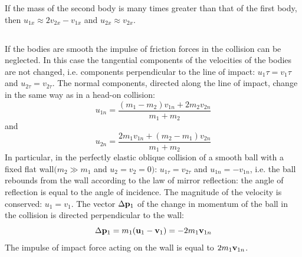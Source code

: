 If the mass of the second body is many times greater than that of the first body, then $u_{1x} \approx 2v_{2x} - v_{1x}$ and $u_{2x} \approx v_{2x}$.

\subsection{}\label{3.5.6}    If the bodies are smooth the impulse of friction forces in the collision can be neglected. In this case the tangential compo­nents of the velocities of the bodies are not changed, i.e. compo­nents perpendicular to the line of impact: $u_{1} \tau = v_{1} \tau$ and $u_{2\tau} = v_{2\tau}$. The normal components, directed along the line of impact, change in the same way as in a head-on collision:
\begin{equation*}%
u_{1n} = \frac{(m_{1} - m_{2})v_{1n} + 2m_{2}v_{2n}}{m_{1}+m_{2}}
\end{equation*}
and
\begin{equation*}%
u_{2n} = \frac{2m_{1}v_{1n} + (m_{2} - m_{1})v_{2n}}{m_{1}+m_{2}}
\end{equation*}
In particular, in the perfectly elastic oblique collision of a smooth ball with a fixed flat wall$(m_{2} \gg m_{1}$ and $u_{2}= v_{2}= 0)$:  $u_{1\tau} = v_{2\tau}$ and $u_{1n} = - v_{1n}$, i.e. the ball rebounds from the wall according to the law of mir­ror reflection: the angle of reflection is equal to the angle of incidence. The magnitude of the velocity is conserved: $u_{1}= v_{1}$. The vector $\Delta \vb{p}_{1}$ of the change in momentum of the ball in the collision is directed perpendicular to the wall:
\begin{equation*}%
\Delta \vb{p}_{1} = m_{1}(\vb{u}_{1} -\vb{v}_{1}) = - 2m_{1}\vb{v}_{1n}
\end{equation*}
The impulse of impact force acting on the wall is equal to $2m_{1}\vb{v}_{1n}$.

